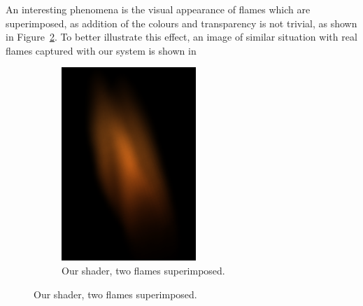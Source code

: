 An interesting phenomena is the visual appearance of flames which are superimposed, as addition of the colours and transparency is not trivial, as shown in Figure~\ref{fig:result_synthetic}.
To better illustrate this effect, an image of similar situation  with real flames captured with our system is shown in 

\begin{figure}[htpb]
        \centering
        \begin{subfigure}[t]{0.2\textwidth}
                \includegraphics[width=\textwidth]{img/result_synthetic}
                \caption{Our shader, two flames superimposed.}
                \label{fig:result_synthetic}
        \end{subfigure}%
        \qquad %

\end{figure}
